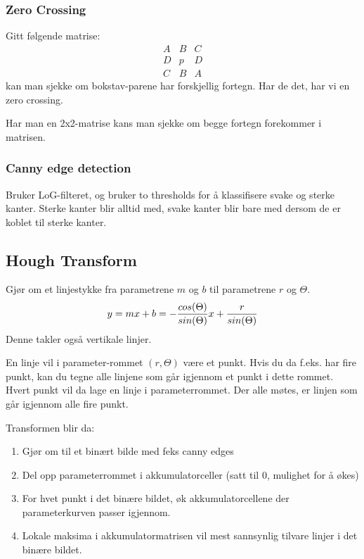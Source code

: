 \subsubsection{Zero Crossing}
Gitt følgende matrise:
$$
    \begin{matrix}
        A & B & C \\
        D & p & D \\
        C & B & A
    \end{matrix}
$$
kan man sjekke om bokstav-parene har forskjellig fortegn. Har de det, har vi en zero crossing.

Har man en 2x2-matrise kans man sjekke om begge fortegn forekommer i matrisen.

\subsubsection{Canny edge detection}
Bruker LoG-filteret, og bruker to thresholds for å klassifisere svake og sterke kanter. Sterke kanter blir alltid med, svake kanter blir bare med dersom de er koblet til sterke kanter.

\subsection{Hough Transform}
Gjør om et linjestykke fra parametrene $m$ og $b$ til parametrene $r$ og $\Theta$.
\begin{equation}
    y = mx + b = -{cos(\Theta) \over sin(\Theta)}x + {r \over sin(\Theta)}
\end{equation}
Denne takler også vertikale linjer.

En linje vil i parameter-rommet $(r, \Theta)$ være et punkt. Hvis du da f.eks. har fire punkt, kan du tegne alle linjene som går igjennom et punkt i dette rommet. Hvert punkt vil da lage en linje i parameterrommet. Der alle møtes, er linjen som går igjennom alle fire punkt.

Transformen blir da:
\begin{enumerate}
    \item Gjør om til et binært bilde med feks canny edges
    \item Del opp parameterrommet i akkumulatorceller (satt til 0, mulighet for å økes)
    \item For hvet punkt i det binære bildet, øk akkumulatorcellene der parameterkurven passer igjennom.
    \item Lokale maksima i akkumulatormatrisen vil mest sannsynlig tilvare linjer i det binære bildet.
\end{enumerate}

